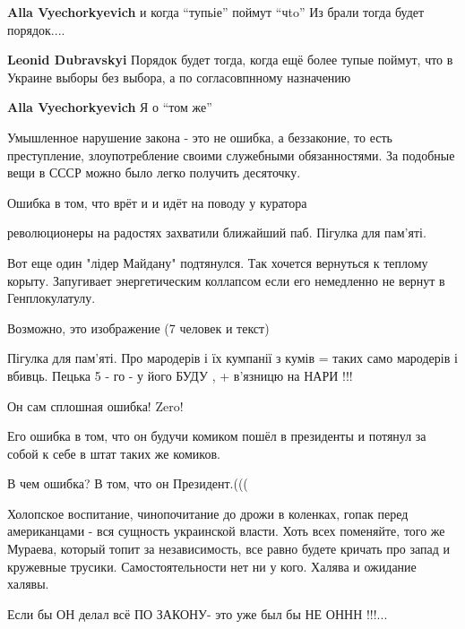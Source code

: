 \begin{itemize}
\begin{itemize} %
\textbf{Alla Vyechorkyevich} и когда \enquote{тупьіе} поймут \enquote{чto} Из брали тогда будет порядок....

\textbf{Leonid Dubravskyi}
Порядок будет тогда, когда ещё более тупые поймут, что в Украине выборы без выбора, а по согласовпнному назначению

\textbf{Alla Vyechorkyevich} Я о \enquote{том же}
\end{itemize} %


Умышленное нарушение закона - это не ошибка, а беззаконие, то есть
преступление, злоупотребление своими служебными обязанностями. За подобные вещи
в СССР можно было легко получить десяточку.


Ошибка в том, что врёт и и идёт на поводу у куратора


революционеры на радостях захватили ближайший паб. Пігулка для пам'яті.


Вот еще один "лідер Майдану" подтянулся. Так хочется вернуться к теплому
корыту. Запугивает энергетическим коллапсом если его немедленно не вернут в
Генплокулатулу.

Возможно, это изображение (7 человек и текст)

Пігулка для пам'яті. Про мародерів і їх кумпанії з кумів = таких само мародерів
і вбивць. Пецька 5 - го - у його БУДУ , + в'язницю на НАРИ !!!

Он сам сплошная ошибка! Zero!


Его ошибка в том, что он будучи комиком пошёл в президенты и потянул за собой к себе в штат таких же комиков.

В чем ошибка? В том, что он Президент.(((


Холопское воспитание, чинопочитание до дрожи в коленках, гопак перед
американцами - вся сущность украинской власти. Хоть всех поменяйте, того же
Мураева, который топит за независимость, все равно будете кричать про запад и
кружевные трусики. Самостоятельности нет ни у кого. Халява и ожидание халявы.

Если бы ОН делал всё ПО ЗАКОНУ- это уже был бы НЕ ОННН !!!...


\end{itemize}
